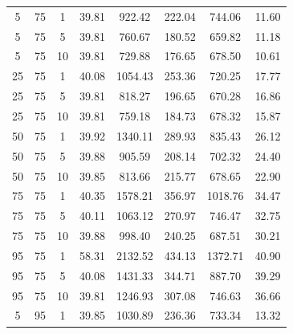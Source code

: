 \begin{table}[H]
\begin{tabular}{ccc|c|c|c|c|c}
5 & 75 & 1 & \cellcolor{gray!80}39.81 & \cellcolor{gray!48}922.42 & \cellcolor{gray!38}222.04 & \cellcolor{gray!55}744.06 & 11.60\\
5 & 75 & 5 & \cellcolor{gray!80}39.81 & \cellcolor{gray!75}760.67 & \cellcolor{gray!77}180.52 & \cellcolor{gray!80}659.82 & 11.18\\
5 & 75 & 10 & \cellcolor{gray!80}39.81 & \cellcolor{gray!80}729.88 & \cellcolor{gray!80}176.65 & \cellcolor{gray!75}678.50 & 10.61\\
25 & 75 & 1 & \cellcolor{gray!78}40.08 & \cellcolor{gray!26}1054.43 & \cellcolor{gray!9}253.36 & \cellcolor{gray!62}720.25 & 17.77\\
25 & 75 & 5 & \cellcolor{gray!80}39.81 & \cellcolor{gray!65}818.27 & \cellcolor{gray!62}196.65 & \cellcolor{gray!77}670.28 & 16.86\\
25 & 75 & 10 & \cellcolor{gray!80}39.81 & \cellcolor{gray!75}759.18 & \cellcolor{gray!73}184.73 & \cellcolor{gray!75}678.32 & 15.87\\
50 & 75 & 1 & \cellcolor{gray!79}39.92 & \cellcolor{gray!1}1340.11 & \cellcolor{gray!1}289.93 & \cellcolor{gray!27}835.43 & 26.12\\
50 & 75 & 5 & \cellcolor{gray!80}39.88 & \cellcolor{gray!51}905.59 & \cellcolor{gray!51}208.14 & \cellcolor{gray!67}702.32 & 24.40\\
50 & 75 & 10 & \cellcolor{gray!80}39.85 & \cellcolor{gray!66}813.66 & \cellcolor{gray!44}215.77 & \cellcolor{gray!75}678.65 & 22.90\\
75 & 75 & 1 & \cellcolor{gray!75}40.35 & \cellcolor{gray!1}1578.21 & \cellcolor{gray!1}356.97 & \cellcolor{gray!1}1018.76 & 34.47\\
75 & 75 & 5 & \cellcolor{gray!78}40.11 & \cellcolor{gray!24}1063.12 & \cellcolor{gray!1}270.97 & \cellcolor{gray!54}746.47 & 32.75\\
75 & 75 & 10 & \cellcolor{gray!80}39.88 & \cellcolor{gray!35}998.40 & \cellcolor{gray!21}240.25 & \cellcolor{gray!72}687.51 & 30.21\\
95 & 75 & 1 & \cellcolor{gray!1}58.31 & \cellcolor{gray!1}2132.52 & \cellcolor{gray!1}434.13 & \cellcolor{gray!1}1372.71 & 40.90\\
95 & 75 & 5 & \cellcolor{gray!78}40.08 & \cellcolor{gray!1}1431.33 & \cellcolor{gray!1}344.71 & \cellcolor{gray!10}887.70 & 39.29\\
95 & 75 & 10 & \cellcolor{gray!80}39.81 & \cellcolor{gray!1}1246.93 & \cellcolor{gray!1}307.08 & \cellcolor{gray!54}746.63 & 36.66\\
5 & 95 & 1 & \cellcolor{gray!80}39.85 & \cellcolor{gray!30}1030.89 & \cellcolor{gray!25}236.36 & \cellcolor{gray!58}733.34 & 13.32\\

\end{tabular}
\end{table}
